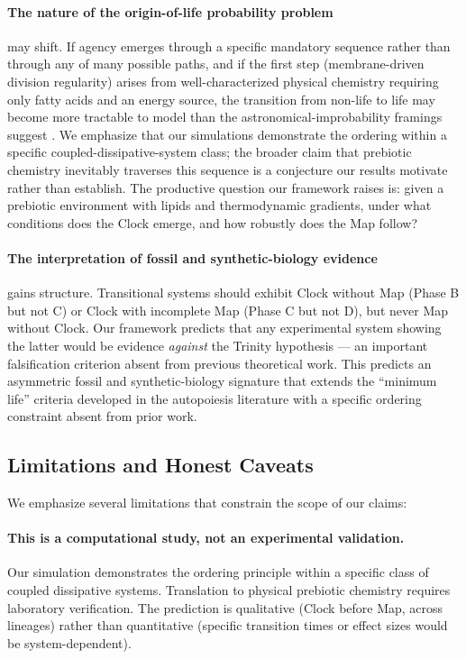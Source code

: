 \documentclass[11pt,letterpaper]{article}
\begin{document}
\paragraph{The nature of the origin-of-life probability problem} may shift. If agency emerges through a specific mandatory sequence rather than through any of many possible paths, and if the first step (membrane-driven division regularity) arises from well-characterized physical chemistry requiring only fatty acids and an energy source, the transition from non-life to life may become more tractable to model than the astronomical-improbability framings suggest \citep{hoyle1981evolution,monod1971chance}. We emphasize that our simulations demonstrate the ordering within a specific coupled-dissipative-system class; the broader claim that prebiotic chemistry inevitably traverses this sequence is a conjecture our results motivate rather than establish. The productive question our framework raises is: given a prebiotic environment with lipids and thermodynamic gradients, under what conditions does the Clock emerge, and how robustly does the Map follow?

\paragraph{The interpretation of fossil and synthetic-biology evidence} gains structure. Transitional systems should exhibit Clock without Map (Phase B but not C) or Clock with incomplete Map (Phase C but not D), but never Map without Clock. Our framework predicts that any experimental system showing the latter would be evidence \emph{against} the Trinity hypothesis --- an important falsification criterion absent from previous theoretical work. This predicts an asymmetric fossil and synthetic-biology signature that extends the ``minimum life'' criteria developed in the autopoiesis literature \citep{ruizmirazo2004basic,luisi2003autopoiesis} with a specific ordering constraint absent from prior work.

\subsection{Limitations and Honest Caveats}

We emphasize several limitations that constrain the scope of our claims:

\paragraph{This is a computational study, not an experimental validation.} Our simulation demonstrates the ordering principle within a specific class of coupled dissipative systems. Translation to physical prebiotic chemistry requires laboratory verification. The prediction is qualitative (Clock before Map, across lineages) rather than quantitative (specific transition times or effect sizes would be system-dependent).
\end{document}
